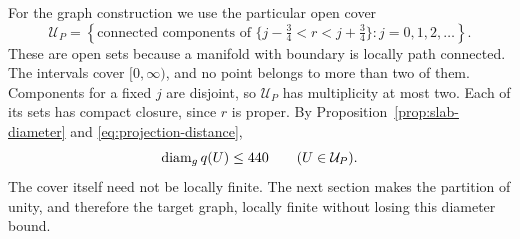 For the graph construction we use the particular open cover
\begin{equation}
\label{eq:slab-cover}
 \mathcal U_P=
 \left\{\text{connected components of }
   \{j-\tfrac34<r<j+\tfrac34\}:j=0,1,2,\ldots\right\}.
\end{equation}
These are open sets because a manifold with boundary is locally
path connected.  The intervals cover $[0,\infty)$, and no point
belongs to more than two of them.  Components for a fixed $j$ are
disjoint, so $\mathcal U_P$ has multiplicity at most two.  Each of
its sets has compact closure, since $r$ is proper.  By
Proposition~\ref{prop:slab-diameter} and
\eqref{eq:projection-distance},
\begin{equation}
\label{eq:cover-diameter}
 \operatorname{diam}_g q(U)\le440 \qquad(U\in\mathcal U_P).
\end{equation}
The cover itself need not be locally finite.  The next section makes
the partition of unity, and therefore the target graph, locally
finite without losing this diameter bound.
